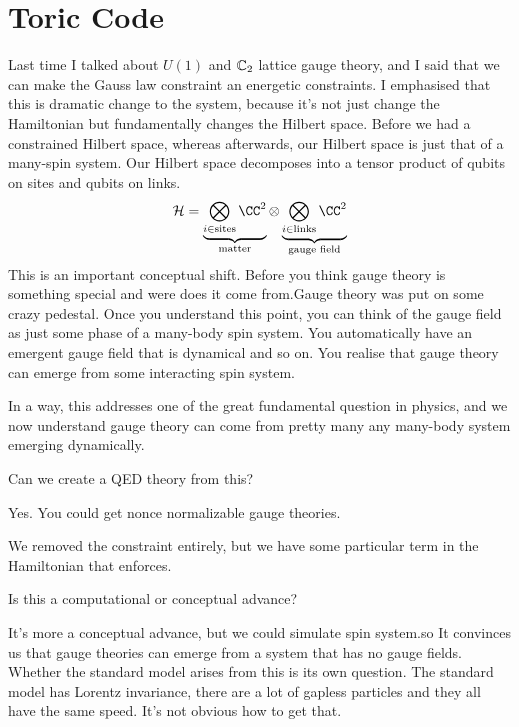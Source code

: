 \section{Toric Code}
Last time I talked about $U(1)$ and $\mathbb{C}_2$ lattice gauge theory,
and I said that we can make the Gauss law constraint an energetic constraints.
I emphasised that this is dramatic change to the system,
because it's not just change the Hamiltonian but fundamentally changes the
Hilbert space.
Before we had a constrained Hilbert space,
whereas afterwards,
our Hilbert space is just that of a many-spin system.
Our Hilbert space decomposes into a tensor product of qubits on sites
and qubits on links.
\begin{align}
    \mathcal{H}
    =
    \underbrace{\bigotimes_{i\in\mathrm{sites}} \CC^2}_{\text{matter}}
    \otimes 
    \underbrace{\bigotimes_{i\in\mathrm{links}} \CC^2}_{\text{gauge field}}
\end{align}
This is an important conceptual shift.
Before you think gauge theory is something special and were does it come
from.Gauge theory was put on some crazy pedestal.
Once you understand this point,
you can think of the gauge field as just some phase of a many-body spin system.
You automatically have an emergent gauge field that is dynamical and so on.
You realise that gauge theory can emerge from some interacting spin system.

In a way,
this addresses one of the great fundamental question in physics,
and we now understand gauge theory can come from pretty many any many-body system
emerging dynamically.

\begin{question}
    Can we create a QED theory from this?
\end{question}
Yes.
You could get nonce normalizable gauge theories.

We removed the constraint entirely,
but we have some particular term in the Hamiltonian that enforces.

\begin{question}
    Is this a computational or conceptual advance?
\end{question}
It's more a conceptual advance,
but we could simulate spin system.so
It convinces us that gauge theories can emerge from a system that has no gauge
fields.
Whether the standard model arises from this is its own question.
The standard model has Lorentz invariance,
there are a lot of gapless particles and they all have the same speed.
It's not obvious how to get that.

